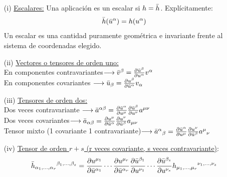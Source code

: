 \begin{enumerate}
    \item[(i)] \underline{Escalares:} Una aplicación es un escalar si $h=\Bar{h}$. Explícitamente:
    $$
    \Bar{h}(\Bar{u}^\alpha )=h(u^\alpha)
    $$
    Un escalar es una cantidad puramente geométrica e invariante frente al sistema de coordenadas elegido.

    \item[(ii)] \underline{Vectores o tensores de orden uno:} \\
    En componentes contravariantes$\longrightarrow \Bar{v}^\beta =\pdv{\Bar{u}^\beta }{u^\alpha }v^\alpha $\\
    En componentes covariantes    $\longrightarrow \Bar{u}_\beta =\pdv{u^\beta }{\Bar{u}^\alpha }v_\alpha $\\

    \item[(iii)] \underline{Tensores de orden dos:} \\
    Dos veces contravariante $\longrightarrow \Bar{a}^{\alpha \beta} =\pdv{\Bar{u}^\alpha }{u^\mu }\pdv{\Bar{u}^\beta }{u^\nu}a^{\mu \nu}$\\
    Dos veces covariantes$\longrightarrow \Bar{a}_{\alpha \beta} =\pdv{u^\mu}{\Bar{u}^\alpha }\pdv{u^\nu }{\Bar{u}^\beta }a_{\mu \nu}$\\
    Tensor mixto (1 covariante 1 contravariante)$\longrightarrow \Bar{a}^\alpha {}_\beta =\pdv{\Bar{u}^\alpha }{u^\mu }\pdv{u^\nu }{\Bar{u}^\beta }a^\mu {}_\nu $

    \item[(iv)] \underline{Tensor de orden $r+s$ (r veces covariante, s veces contravariante)}:
    $$
    \Bar{h}_{\alpha _1,\ldots ,\alpha _r}{}^{\beta_1,\ldots ,\beta_s}=\pdv{u^{\mu_1}}{\Bar{u}^{\alpha _1}}\cdots \pdv{u^{\mu_r}}{\Bar{u}^{\alpha _r}}\pdv{\Bar{u}^{\beta _1}}{u^{\nu_1}}\cdots \pdv{\Bar{u}^{\beta _s}}{u^{\nu_s}} h_{\mu_1,\ldots , \mu _r}{}^{\nu_1, \ldots , \nu_s} 
    $$
\end{enumerate}
